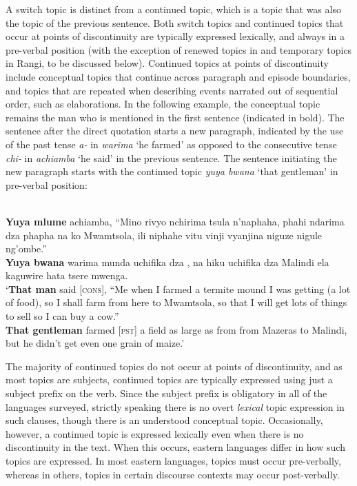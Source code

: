 \documentclass[output=paper]{langsci/langscibook}
\begin{document}
A switch topic is distinct from a continued topic, which is a topic that was also the topic of the previous sentence. Both switch topics and continued topics that occur at points of discontinuity are typically expressed lexically, and always in a pre-verbal position (with the exception of renewed topics in  and temporary topics in Rangi, to be discussed below). Continued topics at points of discontinuity include conceptual topics that continue across paragraph and episode boundaries, and topics that are repeated when describing events narrated out of sequential order, such as elaborations. In the following example, the conceptual topic remains the man who is mentioned in the first sentence (indicated in bold). The sentence after the direct quotation starts a new paragraph, indicated by the use of the past tense \textit{a-} in \textit{warima} ‘he farmed’ as opposed to the consecutive tense \textit{chi-} in \textit{achiamba} ‘he said’ in the previous sentence. The sentence initiating the new paragraph starts with the continued topic \textit{yuya bwana} ‘that gentleman’ in pre-verbal position:

\ea\label{ex:8.nicolle}
\\
  \textbf{Yuya mlume} achiamba, “Mino rivyo nchirima tsula n’naphaha, phahi ndarima dza phapha na ko Mwamtsola, ili niphahe vitu vinji vyanjina niguze nigule ng'ombe.”\\  \textbf{Yuya bwana} warima munda uchifika dza , na hiku uchifika dza Malindi ela kaguwire hata tsere mwenga.\\
\glt `\textbf{That man} said [\textsc{cons}], “Me when I farmed a termite mound I was getting (a lot of food), so I shall farm from here to Mwamtsola, so that I will get lots of things to sell so I can buy a cow.” \\

\textbf{That gentleman} farmed [\textsc{pst}] a field as large as from from Mazeras to Malindi, but he didn’t get even one grain of maize.’
\z

The majority of continued topics do not occur at points of discontinuity, and as most topics are subjects, continued topics are typically expressed using just a subject prefix on the verb. Since the subject prefix is obligatory in all of the languages surveyed, strictly speaking there is no overt \textit{lexical} topic expression in such clauses, though there is an understood conceptual topic. Occasionally, however, a continued topic is expressed lexically even when there is no discontinuity in the text. When this occurs, eastern  languages differ in how such topics are expressed. In most eastern  languages, topics must occur pre-verbally, whereas in others, topics in certain discourse contexts may occur post-verbally.
\end{document}
